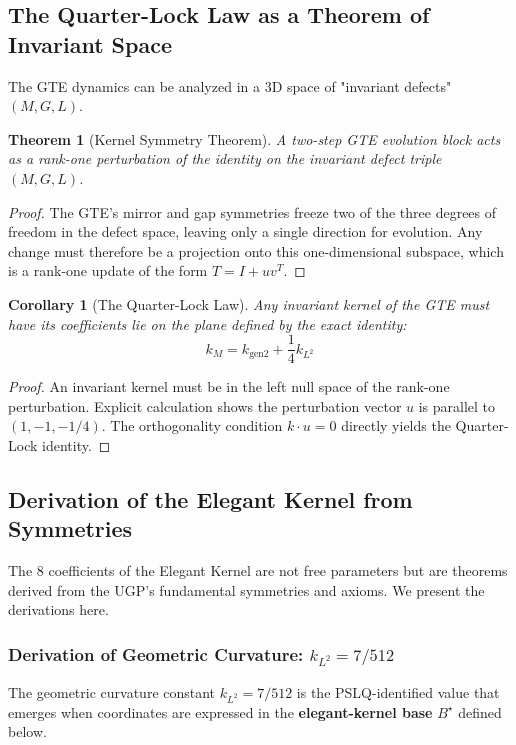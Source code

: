 \documentclass[11pt,twocolumn]{article}
\newtheorem{theorem}{Theorem}[section]
\newtheorem{corollary}{Corollary}[section]
\begin{document}
\subsection{The Quarter-Lock Law as a Theorem of Invariant Space}
The GTE dynamics can be analyzed in a 3D space of "invariant defects" $(M, G, L)$.

\begin{theorem}[Kernel Symmetry Theorem]
A two-step GTE evolution block acts as a rank-one perturbation of the identity on the invariant defect triple $(M, G, L)$.
\end{theorem}
\begin{proof}
The GTE's mirror and gap symmetries freeze two of the three degrees of freedom in the defect space, leaving only a single direction for evolution. Any change must therefore be a projection onto this one-dimensional subspace, which is a rank-one update of the form $T = I + u v^T$.
\end{proof}

\begin{corollary}[The Quarter-Lock Law]
Any invariant kernel of the GTE must have its coefficients lie on the plane defined by the exact identity:
\begin{equation}
    k_M = k_{\text{gen2}} + \frac{1}{4}k_{L^2}
\end{equation}
\end{corollary}
\begin{proof}
An invariant kernel must be in the left null space of the rank-one perturbation. Explicit calculation shows the perturbation vector $u$ is parallel to $(1, -1, -1/4)$. The orthogonality condition $k \cdot u = 0$ directly yields the Quarter-Lock identity.
\end{proof}

\subsection{Derivation of the Elegant Kernel from Symmetries}
The 8 coefficients of the Elegant Kernel are not free parameters but are theorems derived from the UGP's fundamental symmetries and axioms. We present the derivations here.

\subsubsection{Derivation of Geometric Curvature: $k_{L^2} = 7/512$}

The geometric curvature constant $k_{L^2} = 7/512$ is the PSLQ-identified value that emerges when coordinates are expressed in the \textbf{elegant-kernel base} $B^\star$ defined below.
\end{document}
